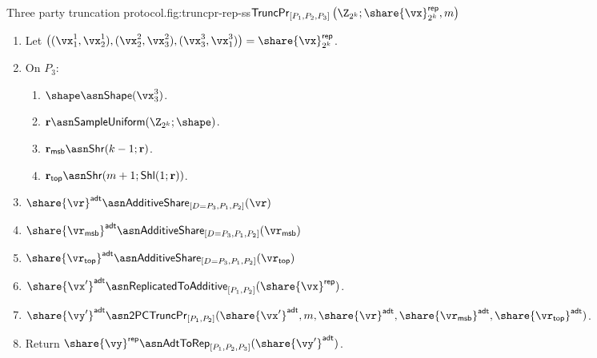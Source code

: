 \begin{Boxfig}{Three party truncation protocol.}{fig:truncpr-rep-ss}{$\mathsf{TruncPr}_{[P_1, P_2, P_3]} \left(\Z_{2^k}; \share{\vx}^{\mathsf{rep}}_{2^k}, m \right)$}
\begin{enumerate}
  \item Let $\left( (\vx_1^1, \vx_2^1), (\vx_2^2, \vx_3^2), (\vx_3^3, \vx_1^3) \right) = \share{\vx}^{\mathsf{rep}}_{2^k}$.

  \item On $P_3$:
  \begin{enumerate}
    \item $\shape \asn \mathsf{Shape}(\vx^3_3)$.
    \item $\mathbf{r} \asn \mathsf{SampleUniform}(\Z_{2^k}; \shape)$.
    \item $\mathbf{r}_{\mathsf{msb}} \asn \mathsf{Shr}(k-1; \mathbf{r})$.
    \item $\mathbf{r}_{\mathsf{top}} \asn \mathsf{Shr}(m+1; \mathsf{Shl}(1; \mathbf{r}))$.
  \end{enumerate}

  \item $\share{\vr}^{\mathsf{adt}} \asn \mathsf{AdditiveShare}_{[D=P_3, P_1, P_2]}(\vr)$

  \item $\share{\vr_{\mathsf{msb}}}^{\mathsf{adt}} \asn \mathsf{AdditiveShare}_{[D=P_3, P_1, P_2]}(\vr_{\mathsf{msb}})$

  \item $\share{\vr_{\mathsf{top}}}^{\mathsf{adt}} \asn \mathsf{AdditiveShare}_{[D=P_3, P_1, P_2]}(\vr_{\mathsf{top}})$

  \item $\share{\vx'}^{\mathsf{adt}} \asn \mathsf{ReplicatedToAdditive}_{[P_1, P_2]}(\share{\vx}^{\mathsf{rep}})$.

  \item $\share{\vy'}^{\mathsf{adt}} \asn \mathsf{2PCTruncPr}_{[P_1, P_2]}(\share{\vx'}^{\mathsf{adt}}, m, \share{\vr}^{\mathsf{adt}}, \share{\vr_{\mathsf{msb}}}^{\mathsf{adt}}, \share{\vr_{\mathsf{top}}}^{\mathsf{adt}} )$.

  \item Return $\share{\vy}^{\mathsf{rep}} \asn \mathsf{AdtToRep}_{[P_1, P_2, P_3]}(\share{\vy'}^{\mathsf{adt}})$.

\end{enumerate}

\end{Boxfig}

